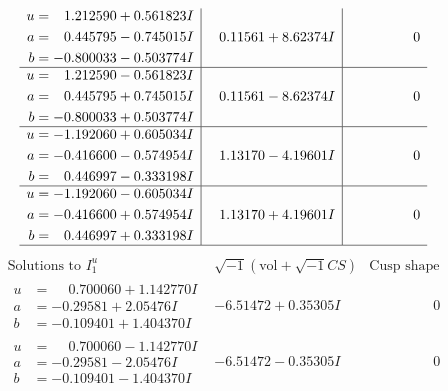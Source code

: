 \documentclass[1p]{elsarticle_modified}
\theoremstyle{definition}
\newcommand{\I}{\sqrt{-1}}
\begin{document}
$$\begin{array}{c|c|c}
\begin{aligned}
u &= \phantom{-}1.212590 + 0.561823 I \\
a &= \phantom{-}0.445795 - 0.745015 I \\
b &= -0.800033 - 0.503774 I\end{aligned}
 & \phantom{-}0.11561 + 8.62374 I & \phantom{-0.000000 } 0 \\ \hline\begin{aligned}
u &= \phantom{-}1.212590 - 0.561823 I \\
a &= \phantom{-}0.445795 + 0.745015 I \\
b &= -0.800033 + 0.503774 I\end{aligned}
 & \phantom{-}0.11561 - 8.62374 I & \phantom{-0.000000 } 0 \\ \hline\begin{aligned}
u &= -1.192060 + 0.605034 I \\
a &= -0.416600 - 0.574954 I \\
b &= \phantom{-}0.446997 - 0.333198 I\end{aligned}
 & \phantom{-}1.13170 - 4.19601 I & \phantom{-0.000000 } 0 \\ \hline\begin{aligned}
u &= -1.192060 - 0.605034 I \\
a &= -0.416600 + 0.574954 I \\
b &= \phantom{-}0.446997 + 0.333198 I\end{aligned}
 & \phantom{-}1.13170 + 4.19601 I & \phantom{-0.000000 } 0\\
 \hline 
 \end{array}$$\newpage$$\begin{array}{c|c|c}  
\text{Solutions to }I^u_{1}& \I (\text{vol} + \sqrt{-1}CS) & \text{Cusp shape}\\
 \hline 
\begin{aligned}
u &= \phantom{-}0.700060 + 1.142770 I \\
a &= -0.29581 + 2.05476 I \\
b &= -0.109401 + 1.404370 I\end{aligned}
 & -6.51472 + 0.35305 I & \phantom{-0.000000 } 0 \\ \hline\begin{aligned}
u &= \phantom{-}0.700060 - 1.142770 I \\
a &= -0.29581 - 2.05476 I \\
b &= -0.109401 - 1.404370 I\end{aligned}
 & -6.51472 - 0.35305 I & \phantom{-0.000000 } 0 \\ \hline\begin{aligned}

\end{aligned}
\end{array}$$
\end{document}
